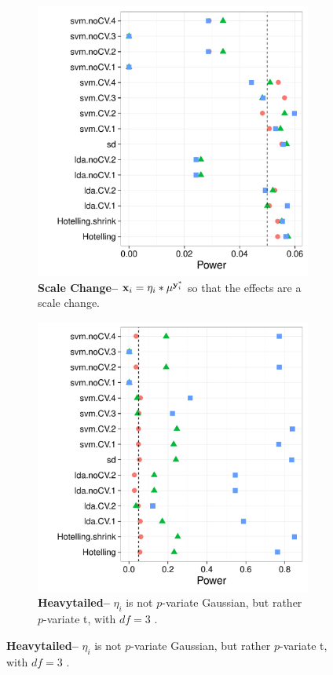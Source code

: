 \documentclass[12pt,a4paper]{article}
\begin{document}
\begin{figure}[h]
\centering
\caption{\mycaption}	
	\begin{subfigure}{.5\textwidth}
	  \centering
	  \includegraphics[width=1\linewidth]{"art/2016-07-30 10:33:05"}
	  \caption{\textbf{Scale Change--} $\mathbf{x}_i =  \eta_i * \mu^ {\mathbf{y}^*_i}$ so that the effects are a scale change.}  
	\label{fig:scale_change}
	\end{subfigure}%
	\begin{subfigure}{.5\textwidth}
	  \centering
	  \includegraphics[width=1\linewidth]{"art/2016-08-04 19:32:17"}
	  \caption{\textbf{Heavytailed--} $\eta_i$ is not $p$-variate Gaussian, but rather $p$-variate t, with $df=3$ .  } 
	\label{fig:t_null}
	\end{subfigure}
\end{figure}
\end{document}
